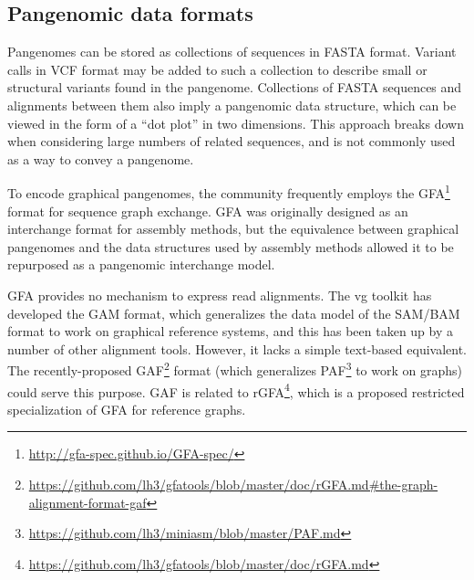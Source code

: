 \begin{comment}
Adding more variants to the graph doesn't always improve mapping precision, however.
FORGe is a tool for modeling the effects of adding a variant to the graph \cite{Pritt_2018}. 
The primary benefit of adding a variant to the graph is that it increases the graph's representation of sequence diversity.
Without variance in the graph, reads with significant sequence dissimilarity from the linear genome won't be mapped to the correct region, or won't be mapped at all.
Sometimes, however, adding a variant can reduce alignment accuracy by increasing the ambiguity of similar sequences already in the graph.
In addition, adding variants to the graph can increase the cost of storing and querying the genome index.
To predict the effects of adding a variant, FORGe scores variants based on their frequency in a population, its proximity to other variants, and how it increases/decreases repetitive sequence in the genome.
It can then output a list of top-scoring variants for use in a graph aligner.
\todo{How do we square the results showing FORGe is needed with the results from our unpublished Graph Genomes manuscript? We don't do that work here.}
\end{comment}


\subsection{Pangenomic data formats}

Pangenomes can be stored as collections of sequences in FASTA format.
Variant calls in VCF format may be added to such a collection to describe small or structural variants found in the pangenome.
Collections of FASTA sequences and alignments between them also imply a pangenomic data structure, which can be viewed in the form of a ``dot plot'' in two dimensions.
This approach breaks down when considering large numbers of related sequences, and is not commonly used as a way to convey a pangenome.

To encode graphical pangenomes, the community frequently employs the GFA\footnote{\url{http://gfa-spec.github.io/GFA-spec/}} format for sequence graph exchange.
GFA was originally designed as an interchange format for assembly methods, but the equivalence between graphical pangenomes and the data structures used by assembly methods allowed it to be repurposed as a pangenomic interchange model.

GFA provides no mechanism to express read alignments.
The vg toolkit has developed the GAM format, which generalizes the data model of the SAM/BAM format to work on graphical reference systems, and this has been taken up by a number of other alignment tools.
However, it lacks a simple text-based equivalent.
The recently-proposed GAF\footnote{\url{https://github.com/lh3/gfatools/blob/master/doc/rGFA.md#the-graph-alignment-format-gaf}} format (which generalizes PAF\footnote{\url{https://github.com/lh3/miniasm/blob/master/PAF.md}} to work on graphs) could serve this purpose.
GAF is related to rGFA\footnote{\url{https://github.com/lh3/gfatools/blob/master/doc/rGFA.md}}, which is a proposed restricted specialization of GFA for reference graphs.


